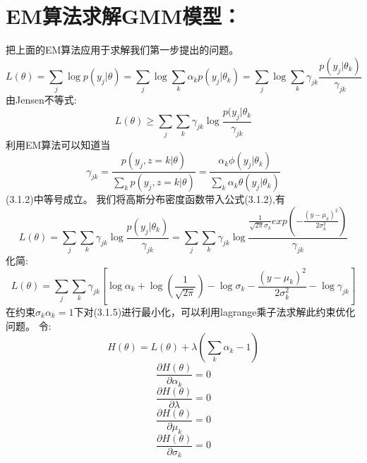 \documentclass{article}
\begin{document}
\section{EM算法求解GMM模型：}
把上面的EM算法应用于求解我们第一步提出的问题。\\
\begin{equation}
L(\theta)=\sum_j \log p(y_j| \theta)=\sum_j \log \sum_k \alpha_k p(y_j|\theta_k)=\sum_j \log \sum_k \gamma_{jk} \frac{p(y_j|\theta_k)}{\gamma_{jk}} \tag{3.1.1}
\end{equation}
由Jensen不等式:
\begin{equation}
L(\theta) \ge \sum_j \sum_k \gamma_{jk} \log \frac{p(y_j|\theta_k}{\gamma_{jk}} \tag{3.1.2}
\end{equation}
利用EM算法可以知道当
\begin{equation}
\gamma_{jk}=\frac{p(y_j,z=k|\theta)}{\sum_{k}p(y_j,z=k|\theta)}=\frac{\alpha_k \phi(y_j|\theta_k)}{\sum_k \alpha_k \theta(y_j|\theta_k)}  \tag{3.1.3}
\end{equation}
(3.1.2)中等号成立。
我们将高斯分布密度函数带入公式(3.1.2),有
\begin{equation}
L(\theta)=\sum_j \sum_k \gamma_{jk} \log \frac{p(y_j|\theta_k)}{\gamma_{jk}}=\sum_j \sum_k \gamma_{jk} \log \frac{\frac{1}{\sqrt{2\pi}\sigma_k}exp(-\frac{(y-\mu_k)^2}{2\sigma_k^2})}{\gamma_{jk}}  \tag {3.1.4}
\end{equation}
化简:
\begin{equation}
L(\theta)=\sum_j \sum_k \gamma_{jk}[\log \alpha_k+\log(\frac{1}{\sqrt{2\pi}})-\log \sigma_k-\frac{(y-\mu_k)^2}{2\sigma_k^2}-\log \gamma_{jk}] \tag {3.1.5}
\end{equation}
在约束$\sigma_k \alpha_k=1$下对(3.1.5)进行最小化，可以利用lagrange乘子法求解此约束优化问题。
令:
\begin{equation}
H(\theta)=L(\theta)+\lambda(\sum_k\alpha_k-1)　\tag{3.1.6}
\end{equation}
\begin{equation}
\frac{\partial{H(\theta)}}{\partial{\alpha_k}}=0 \tag{3.1.7}
\end{equation}
\begin{equation}
\frac{\partial{H(\theta)}}{\partial{\lambda}}=0 \tag{3.1.8}
\end{equation}
\begin{equation}
\frac{\partial{H(\theta)}}{\partial{\mu_k}}=0 \tag{3.1.9}
\end{equation}
\begin{equation}
\frac{\partial{H(\theta)}}{\partial{\sigma_k}}=0 \tag{3.1.10}
\end{equation}
\end{document}

